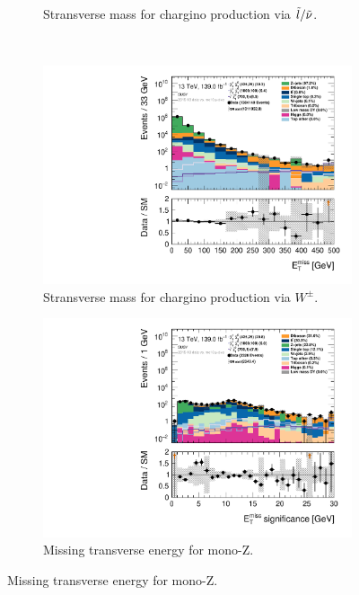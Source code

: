 \begin{figure}[H]
\begin{subfigure}[t!]{0.49\textwidth}
    \caption{Stransverse mass for chargino production via $\Tilde{l}/\Tilde{\nu}$.}
    \label{fig:my_label}
    \end{subfigure}
    \\
    \begin{subfigure}[t!]{0.49\textwidth}
        \includegraphics[width=\textwidth]{Figures/SUSYcuts/hist1d_met_Et_SUSY.pdf}
    \caption{Stransverse mass for chargino production via $W^\pm$.}
    \label{fig:my_label}
    \end{subfigure}
    \begin{subfigure}[t!]{0.49\textwidth}
        \includegraphics[width=\textwidth]{Figures/SUSYcuts/hist1d_met_Sign_SUSY.pdf}
    \caption{Missing transverse energy for mono-Z.}
    \label{fig:my_label}
    \end{subfigure}

\end{figure}
